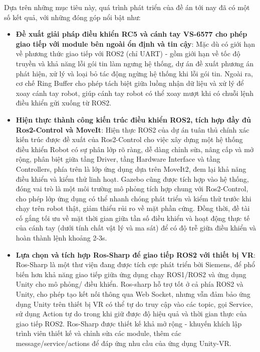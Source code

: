 Dựa trên những mục tiêu này, quá trình phát triển của đề án tới nay đã có một số kết quả, với những đóng góp nổi bật như:

\begin{itemize}
    \item \textbf{Đề xuất giải pháp điều khiển RC5 và cánh tay VS-6577 cho phép giao tiếp với module bên ngoài ổn định và tin cậy}: Mặc dù có giới hạn về phương thức giao tiếp với ROS2 (chỉ UART) - gồm giới hạn về tốc độ truyền và khả năng lỗi gói tin làm ngưng hệ thống, dự án đề xuất phương án phát hiện, xử lý và loại bỏ tác động ngừng hệ thống khi lỗi gói tin. Ngoài ra, cơ chế Ring Buffer cho phép tách biệt giữa luồng nhận dữ liệu và xử lý để xoay cánh tay robot, giúp cánh tay robot có thể xoay mượt khi có chuỗi lệnh điều khiển gửi xuống từ ROS2.
    \item \textbf{Hiện thực thành công kiến trúc điều khiển ROS2, tích hợp đầy đủ Ros2-Control và MoveIt}: Hiện thực ROS2 của dự án tuân thủ chính xác kiến trúc được đề xuất của Ros2-Control cho việc xây dựng một hệ thống điều khiển Robot có sự phân lớp rõ ràng, dễ dàng chỉnh sửa, nâng cấp và mở rộng, phân biệt giữa tầng Driver, tầng Hardware Interface và tầng Controllers, phía trên là lớp ứng dụng dựa trên MoveIt2, đem lại khả năng điều khiển và kiểm thử linh hoạt. Gazebo cũng được tích hợp vào hệ thống, đóng vai trò là một môi trường mô phỏng tích hợp chung với Ros2-Control, cho phép lớp ứng dụng có thể nhanh chóng phát triển và kiểm thử trước khi chạy trên robot thật, giảm thiểu rủi ro về mặt phần cứng. Đồng thời, đề tài cố gắng tối ưu về mặt thời gian giữa tần số điều khiển và hoạt động thực tế của cánh tay (dưới tính chất vật lý và ma sát) để có độ trễ giữa điều khiển và hoàn thành lệnh khoảng 2-3s.
    \item \textbf{Lựa chọn và tích hợp Ros-Sharp để giao tiếp ROS2 với thiết bị VR}: Ros-Sharp là một thư viện đang được tích cực phát triển bởi Siemens, để phổ biến hơn khả năng giao tiếp giữa ứng dụng chạy ROS1/ROS2 và ứng dụng Unity cho mô phỏng/ điều khiển. Ros-sharp hỗ trợ tốt ở cả phía ROS2 và Unity, cho phép tạo kết nối thông qua Web Socket, nhưng vẫn đảm bảo ứng dụng Unity trên thiết bị VR có thể tự do truy cập vào các topic, gọi Service, sử dụng Action tự do trong khi giữ được độ hiệu quả và thời gian thực của giao tiếp ROS2. Ros-Sharp được thiết kế khả mở rộng - khuyến khích lập trình viên thiết kế và chỉnh sửa các module, thêm các message/service/actions để đáp ứng nhu cầu của ứng dụng Unity-VR.

\end{itemize}
